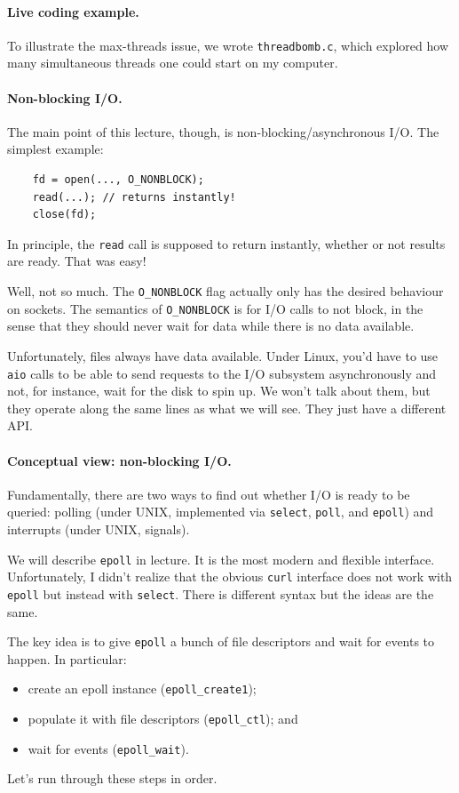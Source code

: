 \paragraph{Live coding example.} To illustrate the max-threads
issue, we wrote {\tt threadbomb.c}, which explored how many simultaneous threads
one could start on my computer.

\paragraph{Non-blocking I/O.} The main point of this lecture, though,
is non-blocking/asynchronous I/O. The simplest example:

\begin{verbatim}
    fd = open(..., O_NONBLOCK);
    read(...); // returns instantly!
    close(fd);
\end{verbatim}

In principle, the {\tt read} call is supposed to return instantly,
whether or not results are ready. That was easy!

Well, not so much. The {\tt O\_NONBLOCK} flag actually only has the
desired behaviour on sockets. The semantics of {\tt O\_NONBLOCK} is
for I/O calls to not block, in the sense that they should never wait
for data while there is no data available.

Unfortunately, files always have data available. Under Linux, you'd have
to use {\tt aio} calls to be able to send requests to the I/O subsystem
asynchronously and not, for instance, wait for the disk to spin up.
We won't talk about them, but they operate along the same lines as what
we will see. They just have a different API.

\paragraph{Conceptual view: non-blocking I/O.} Fundamentally,
there are two ways to find out whether I/O is ready to be queried:
polling (under UNIX, implemented via {\tt select}, {\tt poll},
and {\tt epoll}) and interrupts (under UNIX, signals).


We will describe {\tt epoll} in lecture. It is the most modern and
flexible interface. Unfortunately, I didn't realize that the obvious
{\tt curl} interface does not work with {\tt epoll} but instead with
{\tt select}.  There is different syntax but the ideas are the same.

The key idea is to give {\tt epoll} a bunch of file descriptors and
wait for events to happen. In particular:
     \begin{itemize}
       \item create an epoll instance ({\tt epoll\_create1});
       \item populate it with file descriptors ({\tt epoll\_ctl}); and
       \item wait for events ({\tt epoll\_wait}).
     \end{itemize}
Let's run through these steps in order.

